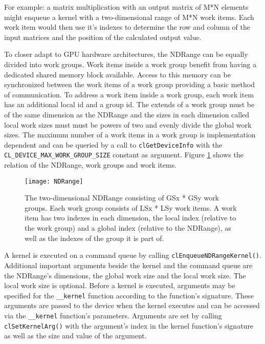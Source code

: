 For example: a matrix multiplication with an output matrix of M*N elements might enqueue a kernel with a two-dimensional range of M*N work items. Each work item would then use it's indexes to determine the row and column of the input matrices and the position of the calculated output value.

To closer adapt to GPU hardware architectures, the NDRange can be equally divided into work groups. Work items inside a work group benefit from having a dedicated shared memory block available. Access to this memory can be synchronized between the work items of a work group providing a basic method of communication. To address a work item inside a work group, each work item has an additional local id and a group id. The extends of a work group must be of the same dimension as the NDRange and the sizes in each dimension called local work sizes must must be powers of two and evenly divide the global work sizes. \cite[p.18]{opencl_book} The maximum number of a work items in a work group is implementation dependent and can be queried by a call to \lstinline!clGetDeviceInfo! with the \lstinline!CL_DEVICE_MAX_WORK_GROUP_SIZE! constant as argument. Figure \ref{fig:NDRange} shows the relation of the NDRange, work groups and work items. 

\begin{figure} 
\centering
\texttt{[image: NDRange]}
\caption{The two-dimensional NDRange consisting of GSx * GSy work groups. Each work group consists of LSx * LSy work items. A work item has two indexes in each dimension, the local index (relative to the work group) and a global index (relative to the NDRange), as well as the indexes of the group it is part of.}
\label{fig:NDRange}
\end{figure}

A kernel is executed on a command queue by calling \lstinline!clEnqueueNDRangeKernel()!. Additional important arguments beside the kernel and the command queue are the NDRange's dimensions, the global work size and the local work size. The local work size is optional. Before a kernel is executed, arguments may be specified for the \lstinline!__kernel! function according to the function's signature. These arguments are passed to the device when the kernel executes and can be accessed via the \lstinline!__kernel! function's parameters. Arguments are set by calling \lstinline!clSetKernelArg()! with the argument's index in the kernel function's signature as well as the size and value of the argument.

